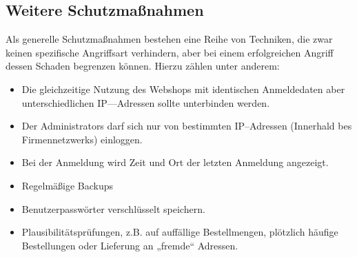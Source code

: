 \subsection{Weitere Schutzmaßnahmen}

Als generelle Schutzmaßnahmen bestehen eine Reihe von Techniken, die zwar keinen spezifische Angriffsart verhindern, aber bei einem erfolgreichen Angriff dessen Schaden begrenzen können. Hierzu zählen unter anderem:

\begin{itemize}
	\item Die gleichzeitige Nutzung des Webshops mit identischen Anmeldedaten aber unterschiedlichen IP––Adressen sollte unterbinden werden.
	\item Der Administrators darf sich nur von bestimmten IP--Adressen (Innerhald bes Firmennetzwerks) einloggen. 
	\item Bei der Anmeldung wird Zeit und Ort der letzten Anmeldung angezeigt.
	\item Regelmäßige Backups
	\item Benutzerpasswörter verschlüsselt speichern.
	\item Plausibilitätsprüfungen, z.B. auf auffällige Bestellmengen, plötzlich häufige Bestellungen oder Lieferung an „fremde“ Adressen.
\end{itemize}